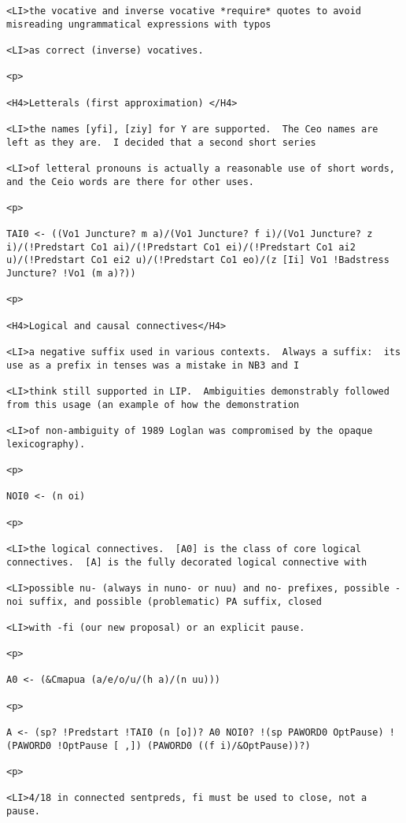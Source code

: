 \documentclass[12pt]{article}
\begin{document}
\begin{lstlisting}
<LI>the vocative and inverse vocative *require* quotes to avoid misreading ungrammatical expressions with typos

<LI>as correct (inverse) vocatives.

<p>

<H4>Letterals (first approximation) </H4>

<LI>the names [yfi], [ziy] for Y are supported.  The Ceo names are left as they are.  I decided that a second short series

<LI>of letteral pronouns is actually a reasonable use of short words, and the Ceio words are there for other uses.

<p>

TAI0 <- ((Vo1 Juncture? m a)/(Vo1 Juncture? f i)/(Vo1 Juncture? z i)/(!Predstart Co1 ai)/(!Predstart Co1 ei)/(!Predstart Co1 ai2 u)/(!Predstart Co1 ei2 u)/(!Predstart Co1 eo)/(z [Ii] Vo1 !Badstress Juncture? !Vo1 (m a)?))

<p>

<H4>Logical and causal connectives</H4>

<LI>a negative suffix used in various contexts.  Always a suffix:  its use as a prefix in tenses was a mistake in NB3 and I

<LI>think still supported in LIP.  Ambiguities demonstrably followed from this usage (an example of how the demonstration

<LI>of non-ambiguity of 1989 Loglan was compromised by the opaque lexicography).

<p>

NOI0 <- (n oi)

<p>

<LI>the logical connectives.  [A0] is the class of core logical connectives.  [A] is the fully decorated logical connective with

<LI>possible nu- (always in nuno- or nuu) and no- prefixes, possible -noi suffix, and possible (problematic) PA suffix, closed

<LI>with -fi (our new proposal) or an explicit pause.

<p>

A0 <- (&Cmapua (a/e/o/u/(h a)/(n uu)))

<p>

A <- (sp? !Predstart !TAI0 (n [o])? A0 NOI0? !(sp PAWORD0 OptPause) !(PAWORD0 !OptPause [ ,]) (PAWORD0 ((f i)/&OptPause))?)

<p>

<LI>4/18 in connected sentpreds, fi must be used to close, not a pause.


\end{lstlisting}
\end{document}
